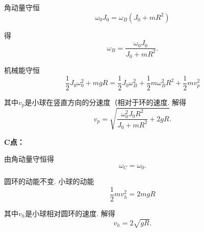 \documentclass[twocolumn]{ctexart}
\begin{document}
	角动量守恒
	$$\omega_0J_0=\omega_B\left(J_0+mR^2\right)$$
	
	得
	$$\omega_B=\frac{\omega_0J_0}{J_0+mR^2}.$$
	
	机械能守恒
	$$\frac{1}{2}J_0\omega_0^2+mgR=\frac{1}{2}J_0\omega_B^2+\frac{1}{2}m\omega_B^2R^2+\frac{1}{2}mv_p^2$$
	
	其中$v_p$是小球在竖直方向的分速度（相对于环的速度. 解得
	$$v_p=\sqrt{\frac{\omega_0^2J_0R^2}{J_0+mR^2}+2gR}.$$
	
	\noindent
	\textbf{C点：}
	
	由角动量守恒得
	$$\omega_C=\omega_0.$$
	
	圆环的动能不变. 小球的动能
	$$\frac{1}{2}mv_h^2=2mgR$$
	
	其中$v_h$是小球相对圆环的速度. 解得
	$$v_h=2\sqrt{gR}.$$
\end{document}
